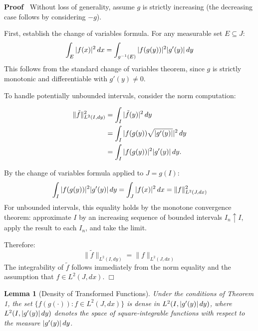 \documentclass{article}
\newenvironment{proof}{\noindent\textbf{Proof\ }}{\hspace*{\fill}$\Box$\medskip}
\newtheorem{lemma}{Lemma}
\begin{document}
\begin{proof}
  Without loss of generality, assume $g$ is strictly increasing (the
  decreasing case follows by considering $- g$).
  
  First, establish the change of variables formula. For any measurable set $E
  \subseteq J$:
  \begin{equation}
    \int_E |f (x) |^2 \hspace{0.17em} dx = \int_{g^{- 1} (E)} |f (g (y)) |^2
    |g' (y) |  \hspace{0.17em} dy
  \end{equation}
  This follows from the standard change of variables theorem, since $g$ is
  strictly monotonic and differentiable with $g' (y) \neq 0$.
  
  To handle potentially unbounded intervals, consider the norm computation:
  
  \begin{align}
    \| \tilde{f} \|_{L^2 (I, dy)}^2 & = \int_I | \tilde{f} (y) |^2 
    \hspace{0.17em} dy \\
    & = \int_I |f (g (y)) \sqrt{|g' (y) |} |^2  \hspace{0.17em} dy \\
    & = \int_I |f (g (y)) |^2 |g' (y) |  \hspace{0.17em} dy. 
  \end{align}
  
  By the change of variables formula applied to $J = g (I)$:
  \begin{equation}
    \int_I |f (g (y)) |^2 |g' (y) | \hspace{0.17em} dy = \int_J |f (x) |^2 
    \hspace{0.17em} dx = \|f\|_{L^2 (J, dx)}^2
  \end{equation}
  For unbounded intervals, this equality holds by the monotone convergence
  theorem: approximate $I$ by an increasing sequence of bounded intervals $I_n
  \uparrow I$, apply the result to each $I_n$, and take the limit.
  
  Therefore:
  \begin{equation}
    \| \tilde{f} \|_{L^2 (I, dy)} = \|f\|_{L^2 (J, dx)}
  \end{equation}
  The integrability of $\tilde{f}$ follows immediately from the norm equality
  and the assumption that $f \in L^2 (J, dx)$.
\end{proof}

\begin{lemma}
  [Density of Transformed Functions] Under the conditions of Theorem 1, the
  set $\{f (g (\cdot)) : f \in L^2 (J, dx)\}$ is dense in $L^2 (I, |g' (y) |
  \hspace{0.17em} dy)$, where $L^2 (I, |g' (y) | \hspace{0.17em} dy)$ denotes
  the space of square-integrable functions with respect to the measure $|g'
  (y) |  \hspace{0.17em} dy$.
\end{lemma}
\end{document}
